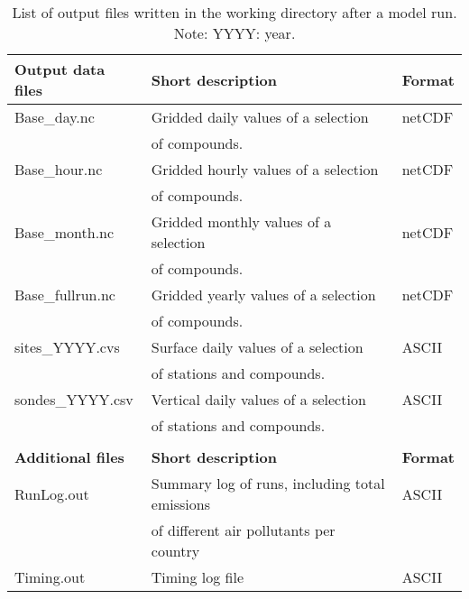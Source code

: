 \begin{table}[h!]
\caption[List of model output files]{List of output files written in the
  working directory after a  model run. 
Note: YYYY: year.}\label{tab:output}
\begin{center}
\hspace{-1cm}
\begin{tabular}{lll}
\hline
{\bf Output data files} &  {\bf Short description} & {\bf Format}\\
\hline
    Base\_day.nc & Gridded daily values of a selection & netCDF\\
&   of compounds.& \\ 
    Base\_hour.nc &Gridded hourly values of a selection &
    netCDF\\  
 &  of compounds.& \\
    Base\_month.nc & Gridded monthly values of a selection&
    netCDF\\
 &  of compounds.& \\
    Base\_fullrun.nc & Gridded yearly values of a selection&
    netCDF\\
 &  of compounds. & \\
    sites\_YYYY.cvs & Surface daily values of a selection&  ASCII\\
 & of stations and compounds.& \\
    sondes\_YYYY.csv & Vertical daily values of a selection& ASCII\\
 &  of stations and compounds. & \\
& &\\ \hline
{\bf Additional files} &  {\bf Short description} & {\bf Format}\\
    RunLog.out & Summary log of runs, including total emissions  & ASCII\\
 &  of different air pollutants per country& \\
Timing.out & Timing log file& ASCII \\
 
\hline
\end{tabular}
\end{center}

\label{Tab:outputs}
\end{table}


